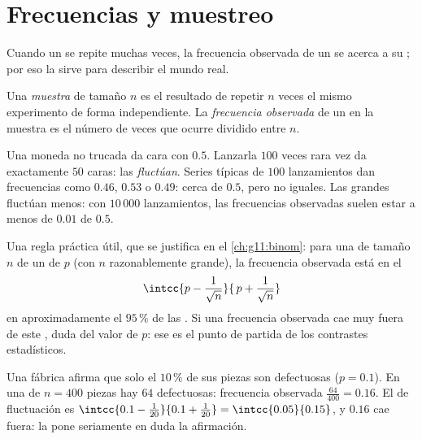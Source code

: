 \section{Frecuencias y muestreo}

Cuando un  se repite muchas veces, la frecuencia
observada de un  se acerca a su ; por eso la
 sirve para describir el mundo real.

\begin{definition}[Muestra]\label{def:g10:proba:sample}
Una \emph{muestra} de tamaño $n$ es el resultado de repetir
$n$ veces el mismo experimento de forma independiente. La
\emph{frecuencia observada} de un  en la muestra es el número de
veces que ocurre dividido entre $n$.
\end{definition}

\begin{example}\label{ex:g10:proba:sampling}
Una moneda no trucada da cara con  $0.5$. Lanzarla $100$ veces
rara vez da exactamente $50$ caras: las  \emph{fluctúan}. Series
típicas de $100$ lanzamientos dan frecuencias como $0.46$, $0.53$ o
$0.49$: cerca de $0.5$, pero no iguales. Las  grandes fluctúan
menos: con $10\,000$ lanzamientos, las frecuencias observadas suelen estar
a menos de $0.01$ de $0.5$.
\end{example}

\begin{remark}
Una regla práctica útil, que se justifica en el \cref{ch:g11:binom}: para
una  de tamaño $n$ de un  de  $p$ (con $n$
razonablemente grande), la frecuencia observada está en el 
\[
\intcc{p - \frac{1}{\sqrt n}}{\,p + \frac{1}{\sqrt n}}
\]
en aproximadamente el $95\,\%$ de las . Si una frecuencia
observada cae muy fuera de este , duda del valor de $p$: ese es
el punto de partida de los contrastes estadísticos.
\end{remark}

\begin{example}\label{ex:g10:proba:test}
Una fábrica afirma que solo el $10\,\%$ de sus piezas son defectuosas
($p = 0.1$). En una  de $n = 400$ piezas hay $64$ defectuosas:
frecuencia observada $\frac{64}{400} = 0.16$. El  de fluctuación
es $\intcc{0.1 - \frac{1}{20}}{0.1 + \frac{1}{20}} = \intcc{0.05}{0.15}$,
y $0.16$ cae fuera: la  pone seriamente en duda la afirmación.
\end{example}

